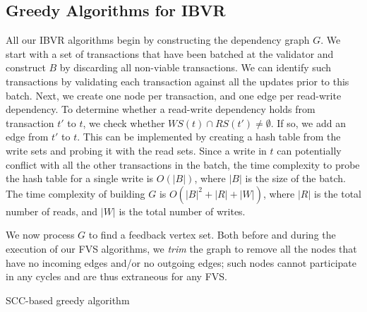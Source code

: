 \subsection{Greedy Algorithms for IBVR}
All our IBVR algorithms begin by constructing the dependency graph $G$. We start with a set of transactions that have been batched at the validator and construct $B$ by discarding all non-viable transactions. We can identify such transactions by validating each transaction against all the updates prior to this batch.
Next, we create one node per transaction, and one edge per read-write dependency. To determine whether a read-write dependency holds from transaction $t'$ to $t$, we check whether $WS(t) \cap RS(t') \neq \emptyset$. If so, we add an edge from $t'$ to $t$. This can be implemented by creating a hash table from the write sets and probing it with the read sets. Since a write in $t$ can potentially conflict with all the other transactions in the batch, the time complexity to probe the hash table for a single write is $O(|B|)$, where $|B|$ is the size of the batch. The time complexity of building $G$ is $O(|B|^2+|R|+|W|)$, where $|R|$ is the total number of reads, and $|W|$ is the total number of writes. 

We now process $G$ to find a feedback vertex set. Both before and during the
execution of our FVS algorithms, we \emph{trim} the graph to remove all the nodes
that have no incoming edges and/or no outgoing edges; such nodes cannot
participate in any cycles and are thus extraneous for any FVS.

\begin{algorithm}[t]
	\SetAlgoLined\DontPrintSemicolon
	
	
	\caption{SCC-based greedy algorithm}
	\label{alg:scc}
\end{algorithm}


